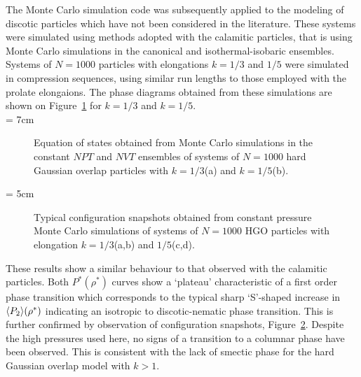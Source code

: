 The Monte Carlo simulation code was subsequently applied to the modeling of discotic particles 
which have not been considered in the literature. These systems were simulated using 
methods adopted with the calamitic
particles, that is using Monte Carlo simulations in the canonical and isothermal-isobaric
ensembles. Systems of $N=1000$ particles with elongations $k=1/3$ and $1/5$ were simulated 
in compression sequences, using similar run lengths to those employed with the prolate elongaions. 
The phase diagrams obtained from these simulations are shown on Figure~\ref{fig:HGO_phaseDia_k0.33_0.2} 
for $k=1/3$ and $k=1/5$.\\

\picW = 7cm
\begin{figure}
	\centering
	\caption{Equation of states obtained from Monte Carlo simulations in the constant $NPT$ and
	$NVT$ ensembles of systems of $N=1000$ hard Gaussian overlap particles with
	$k=1/3$(a) and $k=1/5$(b).}
	\label{fig:HGO_phaseDia_k0.33_0.2}
\end{figure}



\picW = 5cm
\begin{figure}
	\centering
	\hspace*{1cm}
	
	\hspace*{1cm}
	\caption{Typical configuration snapshots obtained from constant pressure Monte Carlo
	simulations of systems of $N=1000$ HGO particles with elongation $k=1/3$(a,b) and $1/5$(c,d).}
	\label{fig:HGOSnaps_k0.33_0.2}
\end{figure}

These results show a similar behaviour to that observed with the calamitic particles. Both
$P^{*}(\rho^{*})$ curves show a `plateau' characteristic of a first order phase
transition which corresponds to the typical sharp `S'-shaped increase in $\langle P_2 \rangle(\rho^{*})$
indicating an isotropic to discotic-nematic phase transition. This is further confirmed by
observation of configuration snapshots, \eg Figure~\ref{fig:HGOSnaps_k0.33_0.2}.
Despite the high pressures used
here, no signs of a transition to a columnar phase have been observed. This is consistent with
the lack of smectic phase for the hard Gaussian overlap model with $k>1$.




